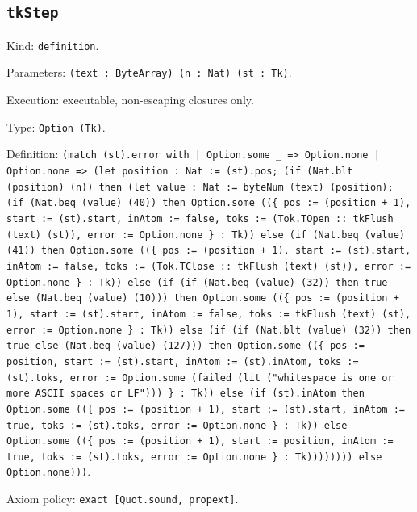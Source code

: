 \documentclass[11pt]{article}
\begin{document}
\subsection*{\texttt{tkStep}}
\noindent Kind: \texttt{definition}.\par
\noindent Parameters: \texttt{(text : ByteArray) (n : Nat) (st : Tk)}.\par
\noindent Execution: executable, non-escaping closures only.\par
\noindent Type: \texttt{Option (Tk)}.\par
\noindent Definition: \texttt{(match (st).error with | Option.some \_ => Option.none | Option.none => (let position : Nat := (st).pos; (if (Nat.blt (position) (n)) then (let value : Nat := byteNum (text) (position); (if (Nat.beq (value) (40)) then Option.some ((\{ pos := (position + 1), start := (st).start, inAtom := false, toks := (Tok.TOpen :: tkFlush (text) (st)), error := Option.none \} : Tk)) else (if (Nat.beq (value) (41)) then Option.some ((\{ pos := (position + 1), start := (st).start, inAtom := false, toks := (Tok.TClose :: tkFlush (text) (st)), error := Option.none \} : Tk)) else (if (if (Nat.beq (value) (32)) then true else (Nat.beq (value) (10))) then Option.some ((\{ pos := (position + 1), start := (st).start, inAtom := false, toks := tkFlush (text) (st), error := Option.none \} : Tk)) else (if (if (Nat.blt (value) (32)) then true else (Nat.beq (value) (127))) then Option.some ((\{ pos := position, start := (st).start, inAtom := (st).inAtom, toks := (st).toks, error := Option.some (failed (lit ("whitespace is one or more ASCII spaces or LF"))) \} : Tk)) else (if (st).inAtom then Option.some ((\{ pos := (position + 1), start := (st).start, inAtom := true, toks := (st).toks, error := Option.none \} : Tk)) else Option.some ((\{ pos := (position + 1), start := position, inAtom := true, toks := (st).toks, error := Option.none \} : Tk)))))))) else Option.none)))}.\par
\noindent Axiom policy: \texttt{exact [Quot.sound, propext]}.\par
\end{document}
